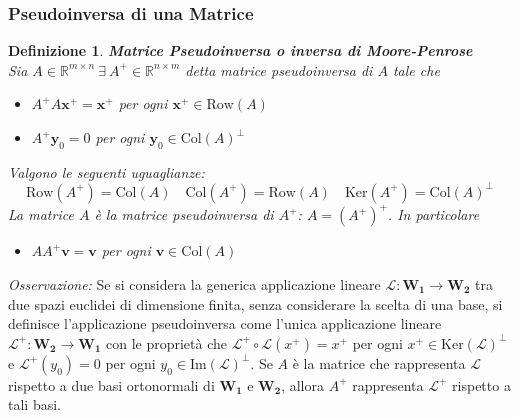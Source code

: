 \documentclass[11pt]{article}
\newtheorem{definition}{Definizione}
\newcommand{\R}{\mathbb{R}} %
\begin{document}
\subsubsection{Pseudoinversa di una Matrice}
\begin{definition}\label{psuedo}
\textbf{Matrice Pseudoinversa o inversa di Moore-Penrose}\\
Sia $A \in \R^{m \times n} \ \exists \ A^+ \in \R^{n \times m}$ detta matrice pseudoinversa di $A$ tale che
\begin{itemize}
	\item $A^+A\mathbf{x}^+=\mathbf{x}^+$ per ogni $\mathbf{x}^+ \in \text{Row}(A)$
	\item $A^+\mathbf{y}_0=0$ per ogni $\mathbf{y}_0 \in \text{Col}(A)^\perp $
\end{itemize}  
Valgono le seguenti uguaglianze:
$$ \text{Row}(A^+)=\text{Col}(A) \quad \text{Col}(A^+)=\text{Row}(A) \quad \text{Ker}(A^+)=\text{Col}(A)^\perp$$
La matrice $A$ è la matrice pseudoinversa di $A^+$: $A=(A^+)^+$. In particolare
\begin{itemize}
	\item $AA^+\mathbf{v}=\mathbf{v}$ per ogni $\mathbf{v} \in \text{Col}(A)$
\end{itemize}
\end{definition}
\noindent
\textit{Osservazione:} Se si considera la generica applicazione lineare $\mathscr{L}: \mathbf{W_1} \rightarrow \mathbf{W_2}$ tra due spazi euclidei di dimensione finita, senza considerare la scelta di una base, si definisce l'applicazione pseudoinversa come l'unica applicazione lineare $\mathscr{L}^+: \mathbf{W_2} \rightarrow \mathbf{W_1}$ con le proprietà che $\mathscr{L}^+ \circ \mathscr{L} (x^+) = x^+$ per ogni $x^+ \in \text{Ker}(\mathscr{L})^\perp$ e $\mathscr{L}^+(y_0)=0$ per ogni $y_0 \in \text{Im}(\mathscr{L})^\perp$. Se $A$ è la matrice che rappresenta $\mathscr{L}$ rispetto a due basi ortonormali di $\mathbf{W_1}$ e $\mathbf{W_2}$, allora $A^+$ rappresenta $\mathscr{L}^+$ rispetto a tali basi.
\end{document}

